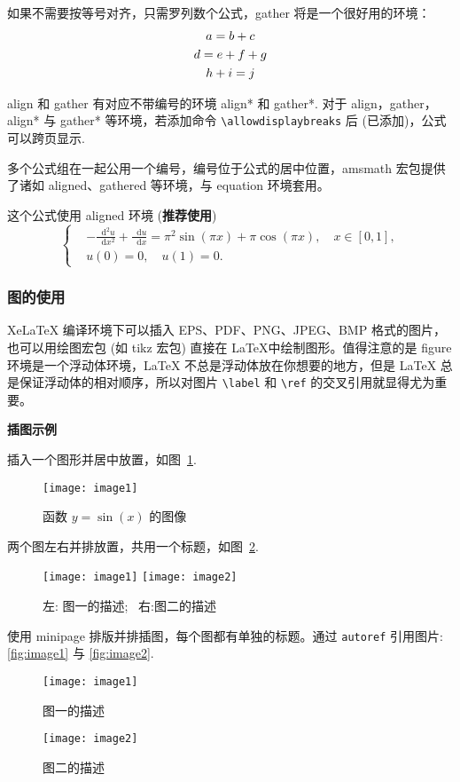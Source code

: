 \documentclass[YF]{nsfc}
\newcommand*{\dif}{\mathop{}\!\mathrm{d}}
\begin{document}
如果不需要按等号对齐，只需罗列数个公式，gather 将是一个很好用的环境：
\begin{gather}
a = b + c \\
d = e + f + g \notag \\
h + i = j
\end{gather}

align 和 gather 有对应不带编号的环境 align* 和 gather*.
对于 align，gather，align* 与 gather* 等环境，若添加命令 \verb|\allowdisplaybreaks| 后 (已添加)，公式可以跨页显示.

多个公式组在一起公用一个编号，编号位于公式的居中位置，amsmath 宏包提供了诸如 aligned、gathered 等环境，与 equation 环境套用。

这个公式使用 aligned 环境 (\textbf{推荐使用})
\begin{equation}\label{eq:alignedEq}
\left\{\begin{aligned}
  &-\frac{{\dif}^{2} u}{\dif x^{2}}+\frac{\dif u}{\dif x}=\pi^{2} \sin (\pi x)+\pi \cos (\pi x),\quad x \in [0,1], \\
  &u(0)=0,\quad u(1)=0.
\end{aligned} \right.
\end{equation}

\subsubsection{图的使用}

XeLaTeX 编译环境下可以插入 EPS、PDF、PNG、JPEG、BMP 格式的图片，也可以用绘图宏包 (如 tikz 宏包) 直接在 \LaTeX 中绘制图形。值得注意的是 figure 环境是一个浮动体环境，LaTeX 不总是浮动体放在你想要的地方，但是 LaTeX 总是保证浮动体的相对顺序，所以对图片 \verb|\label| 和 \verb|\ref| 的交叉引用就显得尤为重要。

\textbf{插图示例}

插入一个图形并居中放置，如图~\ref{fig:sinx}.
\begin{figure}[htp!]
\centering
\texttt{[image: image1]}
\caption{函数 $y=\sin(x)$ 的图像}\label{fig:sinx}
\end{figure}

两个图左右并排放置，共用一个标题，如图~\ref{fig:image}.
\begin{figure}[htp!]
\centering
\texttt{[image: image1]}
\hfill
\texttt{[image: image2]}
\caption{左: 图一的描述;~ 右:图二的描述}
\label{fig:image}
\end{figure}

使用 minipage 排版并排插图，每个图都有单独的标题。通过 \verb|autoref| 引用图片: \autoref{fig:image1} 与 \autoref{fig:image2}.
\begin{figure}[htp!]
\begin{minipage}[t]{0.48\linewidth}
\centering
\texttt{[image: image1]}
\caption{图一的描述}
\label{fig:image1}
\end{minipage}
\hfill
\begin{minipage}[t]{0.48\linewidth}
\centering
\texttt{[image: image2]}
\caption{图二的描述}
\label{fig:image2}
\end{minipage}
\end{figure}
\end{document}
